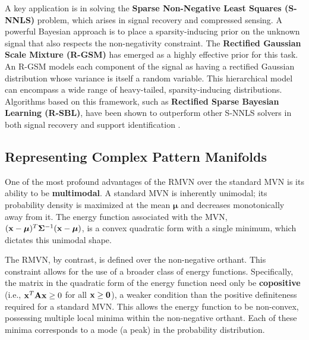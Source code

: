 A key application is in solving the \textbf{Sparse Non-Negative Least Squares (S-NNLS)} problem, which arises in signal recovery and compressed sensing. A powerful Bayesian approach is to place a sparsity-inducing prior on the unknown signal that also respects the non-negativity constraint. The \textbf{Rectified Gaussian Scale Mixture (R-GSM)} has emerged as a highly effective prior for this task. An R-GSM models each component of the signal as having a rectified Gaussian distribution whose variance is itself a random variable. This hierarchical model can encompass a wide range of heavy-tailed, sparsity-inducing distributions. Algorithms based on this framework, such as \textbf{Rectified Sparse Bayesian Learning (R-SBL)}, have been shown to outperform other S-NNLS solvers in both signal recovery and support identification \cite{Ding2013RectifiedFactor, Zayyani2016FastRectified}.

\subsection{Representing Complex Pattern Manifolds}
One of the most profound advantages of the RMVN over the standard MVN is its ability to be \textbf{multimodal}. A standard MVN is inherently unimodal; its probability density is maximized at the mean $\bm{\mu}$ and decreases monotonically away from it. The energy function associated with the MVN, $(\mathbf{x}-\bm{\mu})^T\bm{\Sigma}^{-1}(\mathbf{x}-\bm{\mu})$, is a convex quadratic form with a single minimum, which dictates this unimodal shape.

The RMVN, by contrast, is defined over the non-negative orthant. This constraint allows for the use of a broader class of energy functions. Specifically, the matrix in the quadratic form of the energy function need only be \textbf{copositive} (i.e., $\mathbf{x}^T\mathbf{A}\mathbf{x} \ge 0$ for all $\mathbf{x} \ge \mathbf{0}$), a weaker condition than the positive definiteness required for a standard MVN. This allows the energy function to be non-convex, possessing multiple local minima within the non-negative orthant. Each of these minima corresponds to a mode (a peak) in the probability distribution.

